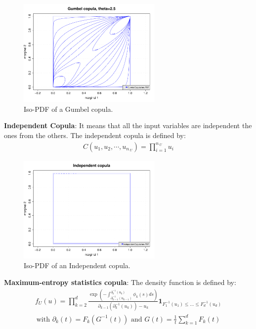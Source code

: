 {  \begin{figure}[H]
    \begin{center}
      \includegraphics[width=7cm]{Figures/GumbelCopula.pdf}
      \caption{Iso-PDF of a  Gumbel copula.}
    \end{center}
  \end{figure}


  {\bf Independent Copula}: It means that all the input variables are independent the ones from the others. The independent copula is defined by:
  \begin{align*}
    C(u_1,u_2,\cdots,u_{n_{\:U}}) = \prod_{i=1}^{n_{\:U}} u_i
  \end{align*}


  \begin{figure}[H]
    \begin{center}
      \includegraphics[width=7cm]{Figures/IndependentCopula.pdf}
      \caption{Iso-PDF of an Independent copula.}
    \end{center}
  \end{figure}


  {\bf Maximum-entropy statistics copula}: The density function is defined by:
  \begin{align*}
    f_U(u) = \prod\limits_{k=2}^d \frac{\exp\left(-\int_{\partial_{k-1}^{-1}(u_{k-1})}^{\partial_k^{-1}(u_k)} \phi_k(s) ds\right)}{\partial_{k-1}(\partial_k^{-1}(u_k))-u_k} \mathbf{1}_{F_1^{-1}(u_1) \leq \dots \leq F_d^{-1}(u_d)}
  \end{align*}
  \begin{align*}
    \text{with } \partial_k(t) = F_k(G^{-1}(t)) \text{ and } G(t) = \frac{1}{t} \sum\limits_{k=1}^d F_k(t)
  \end{align*}


}

